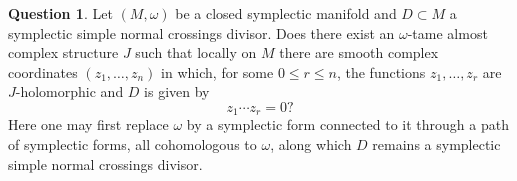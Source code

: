 \documentclass[11pt]{amsart}
\numberwithin{equation}{section}
\theoremstyle{plain}
\theoremstyle{definition}
\newtheorem*{question}{Question}
\begin{document}
\begin{question}
Let $(M,\omega)$ be a closed symplectic manifold and $D\subset M$ a symplectic
simple normal crossings divisor. Does there exist an $\omega$-tame almost
complex structure $J$ such that locally on $M$ there are smooth complex
coordinates $(z_1,\ldots,z_n)$ in which, for some $0\le r\le n$, the functions
$z_1,\ldots,z_r$ are $J$-holomorphic and $D$ is given by
\[
z_1\cdots z_r=0?
\]
Here one may first replace $\omega$ by a symplectic form connected to it
through a path of symplectic forms, all cohomologous to $\omega$, along
which $D$ remains a symplectic simple normal crossings divisor.
\end{question}
\end{document}
